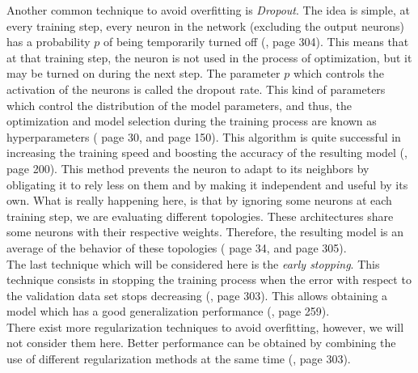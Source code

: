 Another common technique to avoid overfitting is \textit{Dropout}. The idea is simple, at every training step, every neuron in the network (excluding the output neurons) has a probability $p$ of being temporarily turned off (\cite{machine_hands_on}, page 304). This means that at that training step, the neuron is not used in the process of optimization, but it may be turned on during the next step. The parameter $p$ which controls the activation of the neurons is called the dropout rate. This kind of parameters which control the distribution of the model parameters, and thus, the optimization and model selection during the training process are known as hyperparameters (\cite{machine_bishop} page 30, and \cite{deep_learning} page 150). This algorithm is quite successful in increasing the training speed and boosting the accuracy of the resulting model (\cite{deep_learning}, page 200). This method prevents the neuron to adapt to its neighbors by obligating it to rely less on them and by making it independent and useful by its own. What is really happening here, is that by ignoring some neurons at each training step, we are evaluating different topologies. These architectures share some neurons with their respective weights. Therefore, the resulting model is an average of the behavior of these topologies (\cite{fudamentals_deep_learning} page 34, and \cite{machine_hands_on} page 305).\\

The last technique which will be considered here is the \textit{early stopping}. This technique consists in stopping the training process when the error with respect to the validation data set stops decreasing (\cite{machine_hands_on}, page 303). This allows obtaining a model which has a good generalization performance (\cite{machine_hands_on}, page 259).\\

There exist more regularization techniques to avoid overfitting, however, we will not consider them here. Better performance can be obtained by combining the use of different regularization methods at the same time (\cite{machine_hands_on}, page 303).

